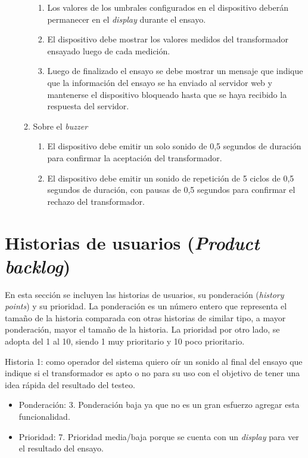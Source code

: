 \documentclass[11pt]{charter}
\begin{document}
\begin{enumerate}
\begin{enumerate}
\begin{enumerate}
		\item Los valores de los umbrales configurados en el dispositivo deberán permanecer en el \textit{display} durante el ensayo.
		\item El dispositivo debe mostrar los valores medidos del transformador ensayado luego de cada medición.
		\item Luego de finalizado el ensayo se debe mostrar un mensaje que indique que la información del ensayo se ha enviado al servidor web y mantenerse el dispositivo bloqueado hasta que se haya recibido la respuesta del servidor.
		\end{enumerate}
	\item Sobre el \textit{buzzer}
		\begin{enumerate}
		\item El dispositivo debe emitir un solo sonido de 0,5 segundos de duración para confirmar la aceptación del transformador.
		\item El dispositivo debe emitir un sonido de repetición de 5 ciclos de 0,5 segundos de duración, con pausas de 0,5 segundos para confirmar el rechazo del transformador.
		\end{enumerate}		
	\end{enumerate}
\end{enumerate}



\section{Historias de usuarios (\textit{Product backlog})}
\label{sec:backlog}

En esta sección se incluyen las historias de usuarios, su ponderación (\textit{history points}) y su prioridad. La ponderación es un número entero que representa el tamaño de la historia comparada con otras historias de similar tipo, a mayor ponderación, mayor el tamaño de la historia. La prioridad por otro lado, se adopta del 1 al 10, siendo 1 muy prioritario y 10 poco prioritario.

Historia 1: como operador del sistema quiero oír un sonido al final del ensayo que indique si el transformador es apto o no para su uso con el objetivo de tener una idea rápida del resultado del testeo.
\begin{itemize}
\item Ponderación: 3. Ponderación baja ya que no es un gran esfuerzo agregar esta funcionalidad.
\item Prioridad: 7. Prioridad media/baja porque se cuenta con un \textit{display} para ver el resultado del ensayo.
\end{itemize}
\end{document}
